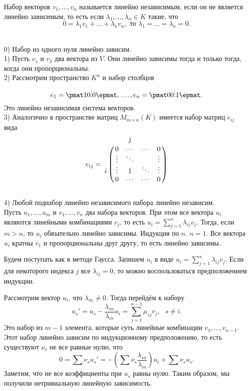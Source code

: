  Набор векторов $v_1,\dots,v_n$ называется линейно независимым, если он не является линейно зависимым, то есть если $\lambda_1, \dots, \lambda_n \in K$ такие, что $$0=\lambda_1v_1+\dots+\lambda_n v_n, \text{ то $\lambda_1=\dots=\lambda_n=0$}.$$
\edfn


\exm \\
0) Набор из одного нуля линейно зависим.\\
1) Пусть $v_1$ и $v_2$ два вектора из $V$. Они линейно зависимы тогда и только тогда, когда они пропорциональны.\\
2) Рассмотрим пространство $K^n$ и набор столбцов
$$e_1=\pmat 1\\0\\ \vdots\\ 0\epmat,\, \dots, e_n=\pmat 0\\ 0 \\ \vdots \\ 1 \epmat.$$
Это линейно независимая система векторов. \\
3) Аналогично в пространстве матриц $M_{m \times n}(K)$ имеется набор матриц $e_{ij}$ вида
$$ e_{ij}=
\bordermatrix{
 & &j&& \cr
 &0&\cdots&\cdots&0\cr
 &\vdots&\ddots && \vdots\cr
i&\vdots& 1 & \ddots& \vdots\cr
 &0&\cdots& \cdots&0
}
$$\\
4) Любой поднабор линейно независимого набора линейно независим.\\


 Пусть $u_1,\dots,u_m$ и $v_1,\dots,v_n$ два набора векторов. При этом все вектора $u_i$ являются линейными комбинациями $v_j$, то есть $u_i=\sum_{j=1}^n \lambda_{ij}v_j$. Тогда, если $m>n$, то $u_i$ обязательно линейно зависимы.
\ethrm
\proof Индукция по $n$. $n=1$. Все вектора $u_i$ кратны $v_1$ и пропорциональны друг другу, то есть линейно зависимы.

Будем поступать как в методе Гаусса. Запишем $u_i$ в виде
$u_i=\sum_{j=1}^n \lambda_{ij}v_j$. Если для некоторого индекса $j$ все $\lambda_{ij}=0$, то можно воспользоваться предположением индукции.

Рассмотрим вектор $u_i$, что $\lambda_{in}\neq 0$. Тогда перейдём к набору $$u_s'=u_s - \frac{\lambda_{sn}}{\lambda_{in}}u_i= \sum_{j=1}^{n-1} \mu_{sj} v_j, \,\,\,\, s\neq i.$$
Это набор из $m-1$ элемента, которые суть линейные комбинации $v_1,\dots,v_{n-1}$. Этот набор линейно зависим по индукционному предположению, то есть существуют $\nu_{s}$ не все равные нулю, что
$$0=\sum \nu_s u_{s}'= -\left(\sum\nu_s\frac{\lambda_{sn}}{\lambda_{in}}\right)u_i +\sum \nu_s u_s.$$
Заметим, что не все коэффициенты при $u_s$ равны нулю. Таким образом, мы получили нетривиальную линейную зависимость.
\endproof






